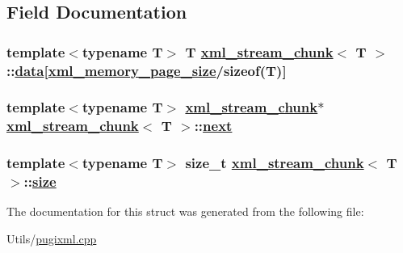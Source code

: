 \subsection{Field Documentation}
\hypertarget{structxml__stream__chunk_365e2e228a0277467b25a0fea42b8518}{
\subsubsection[data]{\setlength{\rightskip}{0pt plus 5cm}template$<$typename T$>$ T \hyperlink{structxml__stream__chunk}{xml\_\-stream\_\-chunk}$<$ T $>$::\hyperlink{structxml__stream__chunk_365e2e228a0277467b25a0fea42b8518}{data}\mbox{[}\hyperlink{pugixml_8cpp_a040c77beb7349f7473f072b6dd364b9}{xml\_\-memory\_\-page\_\-size}/sizeof(T)\mbox{]}}}
\label{structxml__stream__chunk_365e2e228a0277467b25a0fea42b8518}


\hypertarget{structxml__stream__chunk_d00071f7340adb2bde7c4157d4100b3c}{
\subsubsection[next]{\setlength{\rightskip}{0pt plus 5cm}template$<$typename T$>$ \hyperlink{structxml__stream__chunk}{xml\_\-stream\_\-chunk}$\ast$ \hyperlink{structxml__stream__chunk}{xml\_\-stream\_\-chunk}$<$ T $>$::\hyperlink{structxml__stream__chunk_d00071f7340adb2bde7c4157d4100b3c}{next}}}
\label{structxml__stream__chunk_d00071f7340adb2bde7c4157d4100b3c}


\hypertarget{structxml__stream__chunk_42618ba3b7bda1246cfc640149fc34eb}{
\subsubsection[size]{\setlength{\rightskip}{0pt plus 5cm}template$<$typename T$>$ size\_\-t \hyperlink{structxml__stream__chunk}{xml\_\-stream\_\-chunk}$<$ T $>$::\hyperlink{structxml__stream__chunk_42618ba3b7bda1246cfc640149fc34eb}{size}}}
\label{structxml__stream__chunk_42618ba3b7bda1246cfc640149fc34eb}




The documentation for this struct was generated from the following file:\begin{CompactItemize}
\item 
Utils/\hyperlink{pugixml_8cpp}{pugixml.cpp}\end{CompactItemize}
